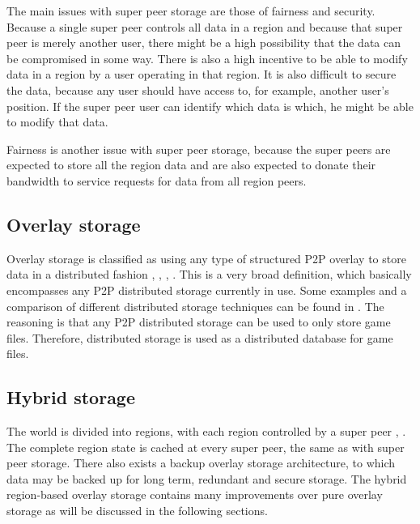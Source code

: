 \documentclass[10pt,a4paper,conference]{IEEEtran}
\begin{document}
The main issues with super peer storage are those of fairness and security. Because a single super peer controls all data in a region and because
that super peer is merely another user, there might be a high possibility that the data can be compromised in some way. There is also a high
incentive to be able to modify data in a region by a user operating in that region. It is also difficult to secure the data, because any user should
have access to, for example, another user's position. If the super peer user can identify which data is which, he might be able to modify that data.

Fairness is another issue with super peer storage, because the super peers are expected to store all the region data and are also expected to donate
their bandwidth to service requests for data from all region peers.


\subsection{Overlay storage}

Overlay storage is classified as using any type of structured P2P overlay to store data in a distributed fashion \cite{Douglas05enablingmassively},
\cite{using_freenet_storage}, \cite{Fan_phd}, \cite{past_storage_focus}. This is a very broad definition, which basically encompasses any P2P
distributed storage currently in use. Some examples and a comparison of different distributed storage techniques can be found in
\cite{Hasan_distributed_storage_survey}. The reasoning is that any P2P distributed storage can be used to only store game files. Therefore,
distributed storage is used as a distributed database for game files.



\subsection{Hybrid storage}

The world is divided into regions, with each region controlled by a super peer \cite{zoned_federation}, \cite{hybrid_storage1}. The complete region
state is cached at every super peer, the same as with super peer storage. There also exists a backup overlay storage architecture, to which data may
be backed up for long term, redundant and secure storage. The hybrid region-based overlay storage contains many improvements over pure overlay
storage as will be discussed in the following sections.
\end{document}
